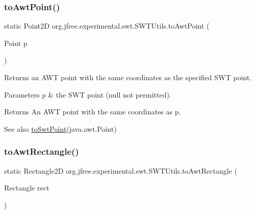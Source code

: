 \subsubsection{\texorpdfstring{to\+Awt\+Point()}{toAwtPoint()}}
{\footnotesize\ttfamily static Point2D org.\+jfree.\+experimental.\+swt.\+S\+W\+T\+Utils.\+to\+Awt\+Point (\begin{DoxyParamCaption}\item[{Point}]{p }\end{DoxyParamCaption})\hspace{0.3cm}{\ttfamily [static]}}

Returns an A\+WT point with the same coordinates as the specified S\+WT point.


\begin{DoxyParams}{Parameters}
{\em p} & the S\+WT point ({\ttfamily null} not permitted).\\
\hline
\end{DoxyParams}
\begin{DoxyReturn}{Returns}
An A\+WT point with the same coordinates as {\ttfamily p}.
\end{DoxyReturn}
\begin{DoxySeeAlso}{See also}
\mbox{\hyperlink{classorg_1_1jfree_1_1experimental_1_1swt_1_1_s_w_t_utils_ac5948a1b7eb5ad479ea2084cba3cd4a7}{to\+Swt\+Point}}(java.\+awt.\+Point) 
\end{DoxySeeAlso}
\mbox{\label{classorg_1_1jfree_1_1experimental_1_1swt_1_1_s_w_t_utils_a61a35d94beb9c34c5ec5db2697e5a2a5}} 
\subsubsection{\texorpdfstring{to\+Awt\+Rectangle()}{toAwtRectangle()}}
{\footnotesize\ttfamily static Rectangle2D org.\+jfree.\+experimental.\+swt.\+S\+W\+T\+Utils.\+to\+Awt\+Rectangle (\begin{DoxyParamCaption}\item[{Rectangle}]{rect }\end{DoxyParamCaption})\hspace{0.3cm}{\ttfamily [static]}}

